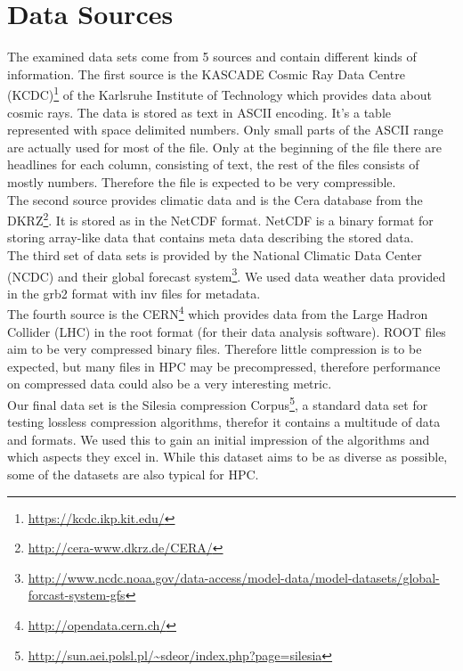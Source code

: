\documentclass[
	12pt,
	a4paper,
	BCOR10mm,
	DIV14,
	listof=totoc,
	bibliography=totoc,
	headsepline
]{scrreprt}
\begin{document}
\section{Data Sources}
The examined data sets come from 5 sources and contain different kinds of information.
The first source is the KASCADE Cosmic Ray Data Centre (KCDC)\footnote{\url{https://kcdc.ikp.kit.edu/}} of the Karlsruhe Institute of Technology which provides data about cosmic rays.
The data is stored as text in ASCII encoding.
It's a table represented with space delimited numbers. Only small parts of the ASCII range are actually used for most of the file. Only at the beginning of the file there are headlines for each column, consisting of text, the rest of the files consists of mostly numbers.
Therefore the file is expected to be very compressible.
\\

The second source provides climatic data and is the Cera database from the DKRZ\footnote{\url{http://cera-www.dkrz.de/CERA/}}.
It is stored as in the NetCDF format.
NetCDF is a binary format for storing array-like data that contains meta data describing the stored data.
\cite{NetCDF}
\\

The third set of data sets is provided by the National Climatic Data Center (NCDC) and their global forecast system\footnote{\url{http://www.ncdc.noaa.gov/data-access/model-data/model-datasets/global-forcast-system-gfs}}.
We used data weather data provided in the grb2 format with inv files for metadata.
\\

The fourth source is the CERN\footnote{\url{http://opendata.cern.ch/}} which provides data from the Large Hadron Collider (LHC) in the root format (for their data analysis software).
ROOT files aim to be very compressed binary files. Therefore little compression is to be expected, but many files in HPC may be precompressed, therefore performance on compressed data could also be a very interesting metric.
\\

Our final data set is the Silesia compression Corpus\footnote{\url{http://sun.aei.polsl.pl/~sdeor/index.php?page=silesia}}, a standard data set for testing lossless compression algorithms, therefor it contains a multitude of data and formats. We used this to gain an initial impression of the algorithms and which aspects they excel in. While this dataset aims to be as diverse as possible, some of the datasets are also typical for HPC.
\\
\newpage
\end{document}
